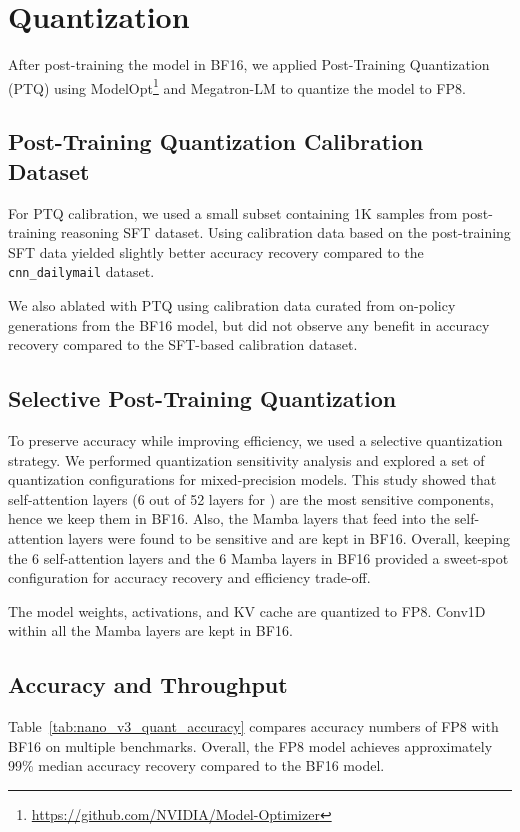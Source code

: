 \section{Quantization}
\label{sec:quantization}

After post-training the model in BF16, we applied Post-Training Quantization (PTQ) using \mbox{ModelOpt}\footnote{\url{https://github.com/NVIDIA/Model-Optimizer}} and Megatron-LM to quantize the model to FP8.

\subsection{Post-Training Quantization Calibration Dataset}
For PTQ calibration, we used a small subset containing 1K samples from post-training reasoning SFT dataset. Using calibration data based on the post-training SFT data yielded slightly better accuracy recovery compared to the \texttt{cnn\_dailymail} dataset.

We also ablated with PTQ using calibration data curated from on-policy generations from the BF16 model, but did not observe any benefit in accuracy recovery compared to the SFT-based calibration dataset. 

\subsection{Selective Post-Training Quantization}
To preserve accuracy while improving efficiency, we used a selective quantization strategy.
%
We performed quantization sensitivity analysis and explored a set of quantization configurations for mixed-precision models. This study showed that self-attention layers (6 out of 52 layers for \ourmodel) are the most sensitive components, hence we keep them in BF16. Also, the Mamba layers that feed into the self-attention layers were found to be sensitive and are kept in BF16. Overall, keeping the 6 self-attention layers and the 6 Mamba layers in BF16 provided a sweet-spot configuration for accuracy recovery and efficiency trade-off.

The model weights, activations, and KV cache are quantized to FP8. Conv1D within all the Mamba layers are kept in BF16. %

\subsection{Accuracy and Throughput} 
\label{subsec:quantaccuracy}
Table~\ref{tab:nano_v3_quant_accuracy} compares accuracy numbers of \ourmodel FP8 with BF16 on multiple benchmarks. Overall, the FP8 model achieves approximately 99\% median accuracy recovery compared to the BF16 model.


